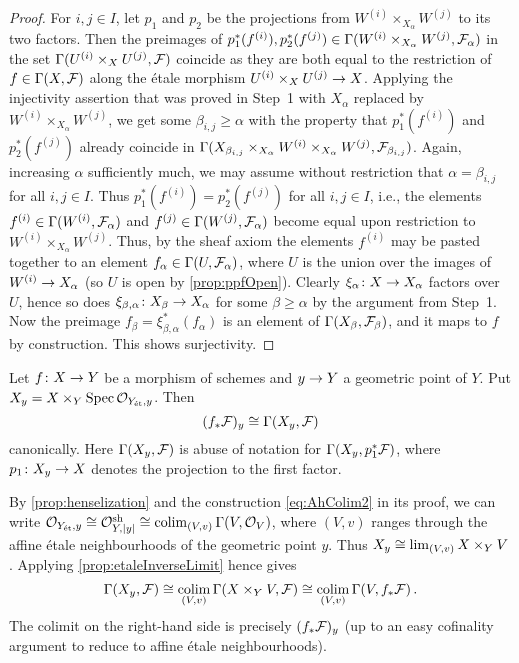 \documentclass[a4paper, 10pt, oneside, DIV=9, chapterprefix=true, numbers=enddot, bibliography=totoc]{scrbook}
\begin{document}
\begin{proof}
	For $i,j\in I$, let $p_1$ and $p_2$ be the projections from $W^{(i)}\times_{X_\alpha}W^{(j)}$ to its two factors. Then the preimages of $p_1^*(f^{(i)}),p_2^*(f^{(j)})\in \operatorname{\Gamma}(W^{(i)}\times_{X_\alpha}W^{(j)},\mathcal{F}_\alpha)$ in the set $\operatorname{\Gamma}(U^{(i)}\times_XU^{(j)},\mathcal{F})$ coincide as they are both equal to the restriction of $f\in\operatorname{\Gamma}(X,\mathcal{F})$ along the étale morphism $U^{(i)}\times_XU^{(j)}\morphism X$. Applying the injectivity assertion that was proved in Step~1 with $X_\alpha$ replaced by $W^{(i)}\times_{X_\alpha}W^{(j)}$, we get some $\beta_{i,j}\geq \alpha$ with the property that $p_1^*(f^{(i)})$ and $p_2^*(f^{(j)})$ already coincide in $\operatorname{\Gamma}(X_{\beta_{i,j}}\times_{X_\alpha}W^{(i)}\times_{X_\alpha}W^{(j)},\mathcal{F}_{\beta_{i,j}})$. Again, increasing $\alpha$  sufficiently much, we may assume without restriction that $\alpha=\beta_{i,j}$ for all $i,j\in I$. Thus $p_1^*(f^{(i)})=p_2^*(f^{(j)})$ for all $i,j\in I$, i.e., the elements $f^{(i)}\in \operatorname{\Gamma} (W^{(i)},\mathcal{F}_\alpha)$ and $f^{(j)}\in \operatorname{\Gamma} (W^{(j)},\mathcal{F}_\alpha)$ become equal upon restriction to $W^{(i)}\times_{X_\alpha}W^{(j)}$. Thus, by the sheaf axiom the elements $f^{(i)}$ may be pasted together to an element $f_\alpha\in\operatorname{\Gamma}(U,\mathcal{F}_\alpha)$, where $U$ is the union over the images of $W^{(i)}\morphism X_\alpha$ (so $U$ is open by \cref{prop:ppfOpen}). Clearly $\xi_\alpha\colon X\morphism X_\alpha$ factors over $U$, hence so does $\xi_{\beta,\alpha}\colon X_\beta\morphism X_\alpha$ for some $\beta\geq \alpha$ by the argument from Step~1. Now the preimage $f_\beta=\xi_{\beta,\alpha}^*(f_\alpha)$ is an element of $\operatorname{\Gamma}(X_\beta,\mathcal{F}_\beta)$, and it maps to $f$ by construction. This shows surjectivity.
\end{proof}
\begin{cor}
	Let $f\colon X\morphism Y$ be a morphism of schemes and $y\morphism Y$ a geometric point of $Y$. Put $X_y=X\times_Y\operatorname{Spec}\mathcal{O}_{Y_{\mathrm{\acute{e}t}},y}$. Then
	\begin{equation*}
		(f_*\mathcal{F})_y\cong \operatorname{\Gamma}(X_y,\mathcal{F})
	\end{equation*}
	canonically. Here $\operatorname{\Gamma}(X_y,\mathcal{F})$ is abuse of notation for $\operatorname{\Gamma}(X_y,p_1^*\mathcal{F})$, where $p_1\colon X_y\morphism X$ denotes the projection to the first factor.
\end{cor}
\begin{proof*}
	By \cref{prop:henselization} and the construction \cref{eq:AhColim2} in its proof, we can write $\mathcal{O}_{Y_{\mathrm{\acute{e}t}},y}\cong \mathcal{O}_{Y,|y|}^{\mathrm{sh}}\cong \operatorname*{colim}_{(V,v)}\operatorname{\Gamma}(V,\mathcal{O}_V)$, where $(V,v)$ ranges through the affine étale neighbourhoods of the geometric point $y$. Thus $X_y\cong \operatorname*{lim}_{(V,v)}X\times_YV$. Applying \cref{prop:etaleInverseLimit} hence gives
	\begin{equation*}
		\operatorname{\Gamma}(X_y,\mathcal{F})\cong \operatorname*{colim}_{(V,v)}\operatorname{\Gamma}(X\times_YV,\mathcal{F})\cong \operatorname*{colim}_{(V,v)}\operatorname{\Gamma}(V,f_*\mathcal{F})\,.
	\end{equation*}
	The colimit on the right-hand side is precisely $(f_*\mathcal{F})_y$ (up to an easy cofinality argument to reduce to affine étale neighbourhoods).
\end{proof*}

\appendix



\backmatter{}
\printbibliography[prenote=LINKS]
\end{document}
